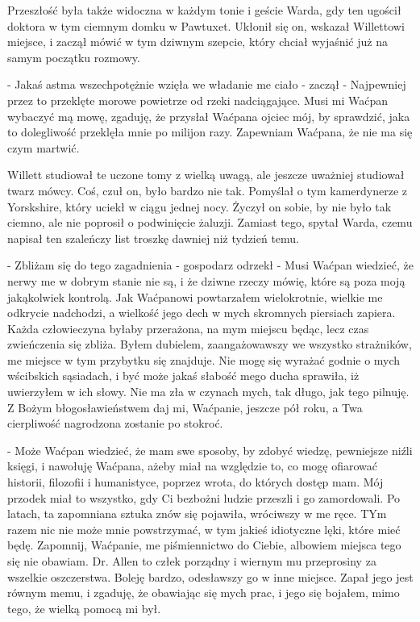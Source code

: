 Przeszłość była także widoczna w każdym tonie i geście Warda, gdy ten ugościł doktora w tym ciemnym domku w Pawtuxet. Ukłonił się on, wskazał Willettowi miejsce, i zaczął mówić w tym dziwnym szepcie, który chciał wyjaśnić już na samym początku rozmowy.

- Jakaś astma wszechpotężnie wzięła we władanie me ciało - zaczął - Najpewniej przez to przeklęte morowe powietrze od rzeki nadciągające. Musi mi Waćpan wybaczyć mą mowę, zgaduję, że przysłał Waćpana ojciec mój, by sprawdzić, jaka to dolegliwość przeklęła mnie po milijon razy. Zapewniam Waćpana, że nie ma się czym martwić. 

Willett studiował te uczone tomy z wielką uwagą, ale jeszcze uważniej studiował twarz mówcy. Coś, czuł on, było bardzo nie tak. Pomyślał o tym kamerdynerze z Yorskshire, który uciekł w ciągu jednej nocy. Życzył on sobie, by nie było tak ciemno, ale nie poprosił o podwinięcie żaluzji. Zamiast tego, spytał Warda, czemu napisał ten szaleńczy list troszkę dawniej niż tydzień temu.

- Zbliżam się do tego zagadnienia - gospodarz odrzekł - Musi Waćpan wiedzieć, że nerwy me w dobrym stanie nie są, i że dziwne rzeczy mówię, które są poza moją jakąkolwiek kontrolą. Jak Waćpanowi powtarzałem wielokrotnie, wielkie me odkrycie nadchodzi, a wielkość jego dech w mych skromnych piersiach zapiera. Każda człowieczyna byłaby przerażona, na mym miejscu będąc, lecz czas zwieńczenia się zbliża. Byłem dubielem, zaangażowawszy we wszystko strażników, me miejsce w tym przybytku się znajduje. Nie mogę się wyrażać godnie o mych wścibskich sąsiadach, i być może jakaś słabość mego ducha sprawiła, iż uwierzyłem w ich słowy. Nie ma zła w czynach mych, tak długo, jak tego pilnuję. Z Bożym błogosławieństwem daj mi, Waćpanie, jeszcze pół roku, a Twa cierpliwość nagrodzona zostanie po stokroć. 

- Może Waćpan wiedzieć, że mam swe sposoby, by zdobyć wiedzę, pewniejsze niźli księgi, i nawołuję Waćpana, ażeby miał na względzie to, co mogę ofiarować historii, filozofii i humanistyce, poprzez wrota, do których dostęp mam. Mój przodek miał to wszystko, gdy Ci bezbożni ludzie przeszli i go zamordowali. Po latach, ta zapomniana sztuka znów się pojawiła, wróciwszy w me ręce. TYm razem nic nie może mnie powstrzymać, w tym jakieś idiotyczne lęki, które mieć będę. Zapomnij, Waćpanie, me piśmiennictwo do Ciebie, albowiem miejsca tego się nie obawiam. Dr. Allen to człek porządny i wiernym mu przeprosiny za wszelkie oszczerstwa. Boleję bardzo, odesławszy go w inne miejsce. Zapał jego jest równym memu, i zgaduję, że obawiając się mych prac, i jego się bojałem, mimo tego, że wielką pomocą mi był. 

